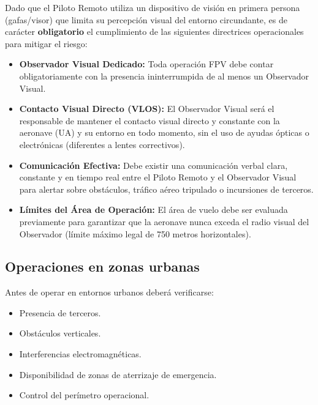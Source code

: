 Dado que el Piloto Remoto utiliza un dispositivo de visión en primera persona (gafas/visor) que limita su percepción visual del entorno circundante, es de carácter \textbf{obligatorio} el cumplimiento de las siguientes directrices operacionales para mitigar el riesgo:

\begin{itemize}
    \item \textbf{Observador Visual Dedicado:} Toda operación FPV debe contar obligatoriamente con la presencia ininterrumpida de al menos un Observador Visual.
    \item \textbf{Contacto Visual Directo (VLOS):} El Observador Visual será el responsable de mantener el contacto visual directo y constante con la aeronave (UA) y su entorno en todo momento, sin el uso de ayudas ópticas o electrónicas (diferentes a lentes correctivos).
    \item \textbf{Comunicación Efectiva:} Debe existir una comunicación verbal clara, constante y en tiempo real entre el Piloto Remoto y el Observador Visual para alertar sobre obstáculos, tráfico aéreo tripulado o incursiones de terceros.
    \item \textbf{Límites del Área de Operación:} El área de vuelo debe ser evaluada previamente para garantizar que la aeronave nunca exceda el radio visual del Observador (límite máximo legal de 750 metros horizontales).
\end{itemize}


\subsection{Operaciones en zonas urbanas}

Antes de operar en entornos urbanos deberá verificarse:

\begin{itemize}

\item Presencia de terceros.

\item Obstáculos verticales.

\item Interferencias electromagnéticas.

\item Disponibilidad de zonas de aterrizaje de emergencia.

\item Control del perímetro operacional.

\end{itemize}

